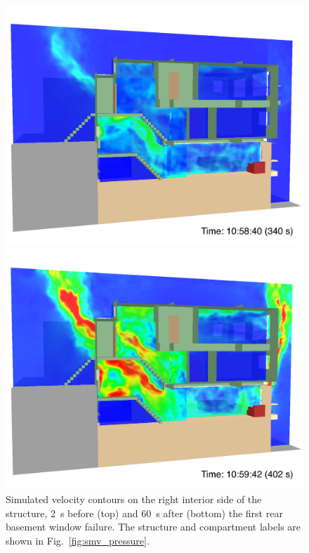 \documentclass[12pt,oneside]{book}
\begin{document}
\begin{figure}[!ht]
\includegraphics[width=4.5in]{../Figures/SMV_Vel_340_s}


\includegraphics[width=4.5in]{../Figures/SMV_Vel_402_s}


\caption[Simulated velocity contours on the right interior side of the structure.]
{Simulated velocity contours on the right interior side of the structure, 2~s before (top) and 60~s after (bottom) the first rear basement window failure. The structure and compartment labels are shown in Fig.~\ref{fig:smv_pressure}.}
\label{fig:smv_velocity}
\end{figure}


\clearpage
\end{document}
